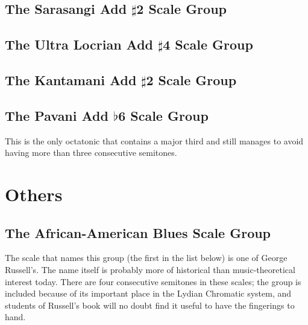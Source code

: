\documentclass[english]{./gbook}
\begin{document}
\begin{large}
\subsection{The Sarasangi Add $\sharp$2 Scale Group}


\subsection{The Ultra Locrian Add $\sharp$4 Scale Group}

\subsection{The Kantamani Add $\sharp$2 Scale Group}


\subsection{The Pavani Add $\flat$6 Scale Group}
This is the only octatonic that contains a major third and still manages to avoid having more than three consecutive semitones.


\section{Others}

\subsection{The African-American Blues Scale Group}
The scale that names this group (the first in the list below) is one of George Russell's. The name itself is probably more of historical than music-theoretical interest today. There are four consecutive semitones in these scales; the group is included because of its important place in the Lydian Chromatic system, and students of Russell's book will no doubt find it useful to have the fingerings to hand.


\end{large}
\end{document}
